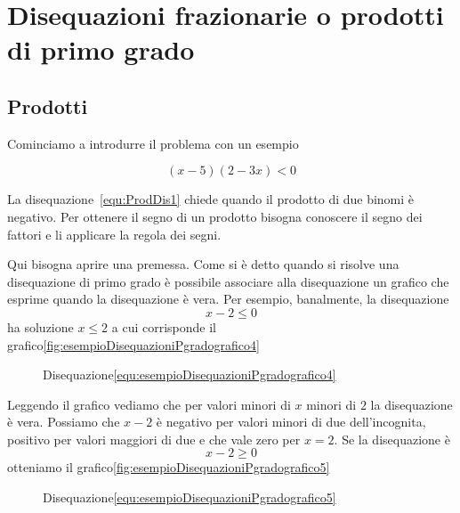 \section{Disequazioni frazionarie o prodotti di primo grado}
\label{DisequazioniFrazionarieProdottiPrimoGrado}
\subsection{Prodotti}
Cominciamo a introdurre il problema con un esempio
\begin{esempiot}{}{}
	\begin{equation}
(x-5)(2-3x)<0\label{equ:ProdDis1}
\end{equation}
\end{esempiot}
La disequazione~\vref{equ:ProdDis1} chiede quando il prodotto di due binomi è negativo.  Per ottenere il segno di un prodotto bisogna conoscere il segno dei fattori e li applicare la regola dei segni.   

Qui bisogna aprire una premessa. Come si è detto quando si risolve una disequazione di primo grado è possibile associare alla disequazione un grafico che esprime quando la disequazione è vera. Per esempio, banalmente, la disequazione
\begin{equation}
x-2\leq 0\label{equ:esempioDisequazioniPgradografico4}
\end{equation} ha soluzione $x\leq 2$ a cui corrisponde il grafico\nobs\vref{fig:esempioDisequazioniPgradografico4}
\begin{figure}
	\centering
		\captionsetup{format=grafico,list=no}
	\caption{Disequazione\nobs\vref{equ:esempioDisequazioniPgradografico4}}
	\label{fig:esempioDisequazioniPgradografico4}
\end{figure}

Leggendo il grafico vediamo che  per valori minori di $x$  minori di $2$ la disequazione è vera. Possiamo che $x-2$ è negativo per valori minori di due dell'incognita, positivo per valori maggiori di due e che vale zero per $x=2$. Se la disequazione è 
\begin{equation}
x-2\geq 0\label{equ:esempioDisequazioniPgradografico5}
\end{equation}
otteniamo il grafico\nobs\vref{fig:esempioDisequazioniPgradografico5}
\begin{figure}
	\centering
	\captionsetup{format=grafico,list=no}
	\caption{Disequazione\nobs\vref{equ:esempioDisequazioniPgradografico5}}
	\label{fig:esempioDisequazioniPgradografico5}
\end{figure}

